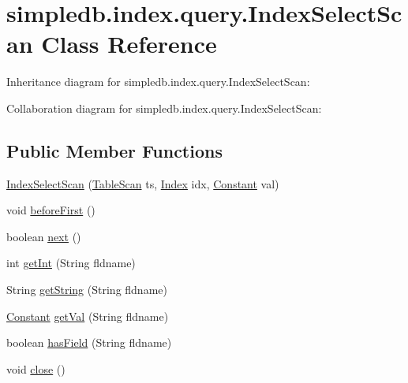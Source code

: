 \hypertarget{classsimpledb_1_1index_1_1query_1_1IndexSelectScan}{}\section{simpledb.\+index.\+query.\+Index\+Select\+Scan Class Reference}
\label{classsimpledb_1_1index_1_1query_1_1IndexSelectScan}


Inheritance diagram for simpledb.\+index.\+query.\+Index\+Select\+Scan\+:


Collaboration diagram for simpledb.\+index.\+query.\+Index\+Select\+Scan\+:
\subsection*{Public Member Functions}
\begin{DoxyCompactItemize}
\item 
\hyperlink{classsimpledb_1_1index_1_1query_1_1IndexSelectScan_a5295fb74f4f980e11d1c68c4a046dbb7}{Index\+Select\+Scan} (\hyperlink{classsimpledb_1_1record_1_1TableScan}{Table\+Scan} ts, \hyperlink{interfacesimpledb_1_1index_1_1Index}{Index} idx, \hyperlink{classsimpledb_1_1query_1_1Constant}{Constant} val)
\item 
void \hyperlink{classsimpledb_1_1index_1_1query_1_1IndexSelectScan_a4d7ce96f840cfc13840b3dcbee65801a}{before\+First} ()
\item 
boolean \hyperlink{classsimpledb_1_1index_1_1query_1_1IndexSelectScan_af642270c5b38d4c87d6a60218660b60e}{next} ()
\item 
int \hyperlink{classsimpledb_1_1index_1_1query_1_1IndexSelectScan_aae5a05685f70eff1c67c9d4b47b84ba8}{get\+Int} (String fldname)
\item 
String \hyperlink{classsimpledb_1_1index_1_1query_1_1IndexSelectScan_ab67c9c8e34fa77975e00d9202075df3b}{get\+String} (String fldname)
\item 
\hyperlink{classsimpledb_1_1query_1_1Constant}{Constant} \hyperlink{classsimpledb_1_1index_1_1query_1_1IndexSelectScan_a2fc2cb0693d8c75ab2265b920f923439}{get\+Val} (String fldname)
\item 
boolean \hyperlink{classsimpledb_1_1index_1_1query_1_1IndexSelectScan_a5ab76aa38dcde3d563d88753c9c171ce}{has\+Field} (String fldname)
\item 
void \hyperlink{classsimpledb_1_1index_1_1query_1_1IndexSelectScan_a5dab2095d3e3d77a6db1f8ad849dc8ad}{close} ()
\end{DoxyCompactItemize}


